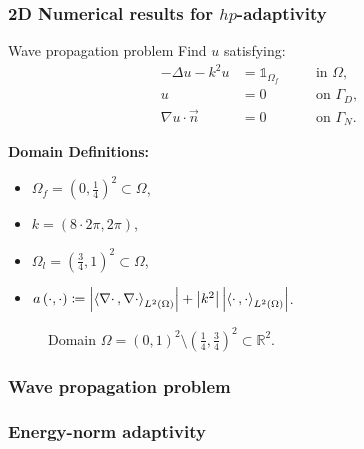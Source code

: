 \begin{frame}
  \frametitle{2D Numerical results for $hp$-adaptivity}
  
  \begin{block}{Wave propagation problem}
     Find \(u\) satisfying:
    \begin{alignat}{2}
      - \Delta u -k^{2}u   & = \mathds{1}_{\Omega_{f}} &  & \quad \text{in } \Omega, \label{eq:helmholtzgoal} \\
      u                    & = 0                       &  & \quad \text{on } \Gamma_{D}, \\
      \nabla u \cdot \vec{n} & = 0                     &  & \quad \text{on } \Gamma_{N}.
    \end{alignat}
  \end{block}

  \begin{multicols}{2}
    \textbf{Domain Definitions:}
    \begin{itemize}
      \item \(\Omega_{f} = \left(0,\frac{1}{4}\right)^{2} \subset \Omega\), 
      \item \(k = \left(8 \cdot 2 \pi, 2 \pi\right)\), 
      \item \(\Omega_{l} = \left(\frac{3}{4},1\right)^{2} \subset \Omega\),
      \item \(a\left(\cdot ,\cdot\right) \coloneqq \left|\left<\nabla \cdot\,,\nabla \cdot\right>_{L^{2}\left(\Omega\right)}\right| + \left|k^{2}\right| \left|\left<\cdot\,,\cdot\right>_{L^{2}\left(\Omega\right)}\right|\).
    \end{itemize}

   \begin{figure}
      \centering
      
      \caption{Domain \(\Omega = \left(0,1\right)^{2} \setminus \left(\frac{1}{4},\frac{3}{4}\right)^{2} \subset \mathbb{R}^{2}\).}
    \end{figure}

  \end{multicols}

\end{frame}

\begin{frame}
	\frametitle{Wave propagation problem}
	\begin{figure}[t!]
	\end{figure}
\end{frame}
%
\begin{frame}
	\frametitle{Energy-norm adaptivity}
\end{frame}
%
%
%    
%

